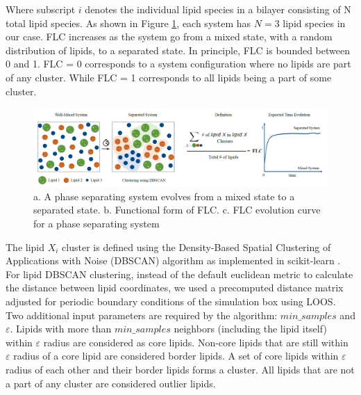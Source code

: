 \documentclass{biophys-new}
\begin{document}
Where subscript $i$ denotes the individual lipid species in a bilayer consisting of N total lipid species.
As shown in Figure \ref{fig2:view}, each system has $N=3$ lipid species in our case.
FLC increases as the system go from a mixed state, with a random distribution of lipids, to a separated state.
In principle, FLC is bounded between 0 and 1. FLC = 0 corresponds to a system configuration where no lipids are part of any cluster.
While FLC = 1 corresponds to all lipids being a part of some cluster. 

\begin{figure}[hbt!]
\centering
\includegraphics[width=1\linewidth]{Figures/Figure1.PNG}
\caption{a. A phase separating system evolves from a mixed state to a separated state. b. Functional form of FLC. c. FLC evolution curve for a phase separating system}
\label{fig2:view}

\end{figure}


The lipid $X_i$ cluster is defined using the Density-Based Spatial Clustering of Applications with Noise (DBSCAN) algorithm \cite{MartinEsterHans-PeterKriegelJiirgSander1996,Ester2017} as implemented in scikit-learn \cite{PedregosaF.VaroquauxG.GramfortA.MichelV.ThirionB.GriselO.BlondelM.PrettenhoferP.WeissR.andDubourgV.VanderplasJ.PassosA.CournapeauD.BrucherM.PerrotM.Duchesnay2011}.
For lipid DBSCAN clustering, instead of the default euclidean metric to calculate the distance between lipid coordinates, we used a precomputed distance matrix adjusted for periodic boundary conditions of the simulation box using LOOS.
Two additional input parameters are required by the algorithm: $min\_samples$ and $\varepsilon$.
Lipids with more than $min\_samples$ neighbors (including the lipid itself) within $\varepsilon$ radius are considered as core lipids.
Non-core lipids that are still within $\varepsilon$ radius of a core lipid are considered border lipids.
A set of core lipids within $\varepsilon$ radius of each other and their border lipids forms a cluster.
All lipids that are not a part of any cluster are considered outlier lipids.
\end{document}
